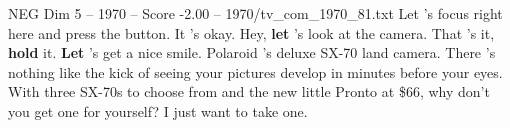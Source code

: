 \begin{textsample}{NEG Dim 5 – 1970 – Score -2.00 – 1970/tv\_com\_1970\_81.txt}  \label{ex:f5_neg_054}
Let 's focus right here and press the button.
It 's okay.
Hey, \textbf{let} 's look at the camera.
That 's it, \textbf{hold} it. \textbf{Let} 's get a nice smile.
Polaroid 's deluxe SX-70 land camera.
There 's nothing like the kick of seeing your pictures develop in minutes before your eyes.
With three SX-70s to choose from and the new little Pronto at \$66, why don't you get one for yourself?
I just want to take one.

\end{textsample}
